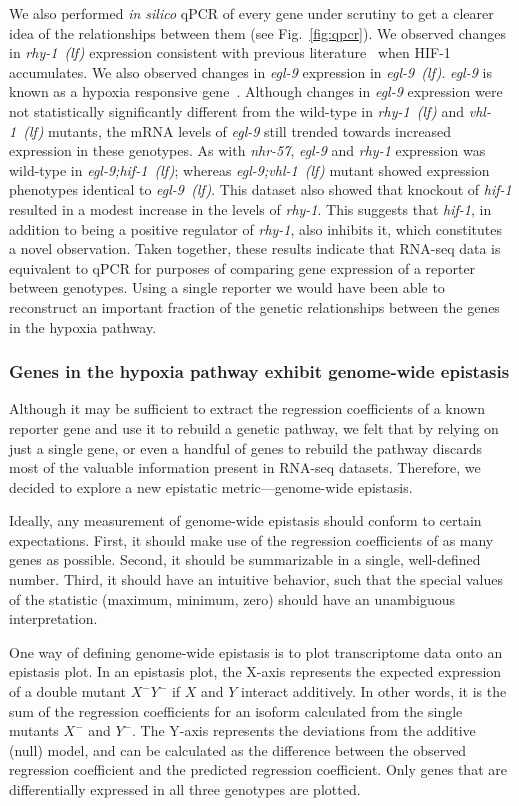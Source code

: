 \documentclass[9pt,twocolumn,twoside]{pnas-new}
\newcommand{\gene}[1]{\emph{#1}}
\newcommand{\nhr}{\emph{nhr-57}}
\newcommand{\egl}{\emph{egl-9~(lf)}}
\newcommand{\rhy}{\emph{rhy-1~(lf)}}
\newcommand{\vhl}{\emph{vhl-1~(lf)}}
\newcommand{\eglvhl}{\emph{egl-9;vhl-1~(lf)}}
\newcommand{\eglhif}{\emph{egl-9;hif-1~(lf)}}
\newcommand{\hifp}{HIF-1}
\begin{document}
We also performed \emph{in silico} qPCR of every gene under scrutiny to get a
clearer idea of the relationships between them (see Fig.~\ref{fig:qpcr}). We
observed changes in \rhy{} expression consistent with previous
literature~\cite{Shen2006} when \hifp{} accumulates.
We also observed changes in \gene{egl-9} expression in \egl{}.
\gene{egl-9} is known as a hypoxia responsive gene~\cite{Powell-Coffman2010}.
Although changes in \gene{egl-9} expression were not statistically significantly
different from the wild-type in
\rhy{} and \vhl{} mutants, the mRNA levels of \gene{egl-9} still trended towards
increased expression in these genotypes. As with \nhr{}, \gene{egl-9} and
\gene{rhy-1} expression was wild-type in \eglhif{}; whereas \eglvhl{}
mutant showed expression phenotypes identical to \egl{}. This dataset also showed
that knockout of \gene{hif-1} resulted in a modest increase in
the levels of \gene{rhy-1}. This suggests that \gene{hif-1}, in addition to being
a positive regulator of \gene{rhy-1}, also inhibits it, which constitutes a novel
observation. Taken together, these results indicate that RNA-seq data is
equivalent to qPCR for purposes of comparing gene expression of a reporter between
genotypes. Using a single reporter we would have been able to reconstruct an
important fraction of the genetic relationships between the genes in the hypoxia
pathway.

\subsubsection*{Genes in the hypoxia pathway exhibit genome-wide epistasis}
Although it may be sufficient to extract the regression coefficients of a
known reporter gene and use it to rebuild a genetic pathway, we felt that by
relying on just a single gene, or even a handful of genes to rebuild the pathway
discards most of the valuable information present in RNA-seq datasets. Therefore,
we decided to explore a new epistatic metric---genome-wide epistasis.

Ideally, any measurement of genome-wide epistasis should conform to certain
expectations. First, it should make use of the regression coefficients of as
many genes as possible. Second, it should be summarizable in a single,
well-defined number. Third, it should have an intuitive behavior, such that
the special values of the statistic (maximum, minimum, zero) should have an
unambiguous interpretation.

One way of defining genome-wide epistasis is to plot transcriptome data onto
an epistasis plot. In an epistasis plot, the X-axis represents the
expected expression of a double mutant $X^-Y^-$ if $X$ and $Y$ interact additively.
In other words, it is the sum of the regression coefficients for an isoform
calculated from the single mutants $X^-$ and $Y^-$. The Y-axis represents the
deviations from the additive (null) model, and
can be calculated as the difference between the observed regression coefficient
and the predicted regression coefficient. Only genes that are differentially
expressed in all three genotypes are plotted.
\end{document}
